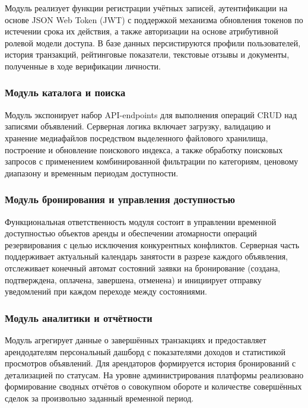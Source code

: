 Модуль реализует функции регистрации учётных записей, аутентификации на основе JSON Web Token (JWT) с поддержкой механизма обновления токенов по истечении срока их действия, а также авторизации на основе атрибутивной ролевой модели доступа. В базе данных персистируются профили пользователей, история транзакций, рейтинговые показатели, текстовые отзывы и документы, полученные в ходе верификации личности.
 
\subsubsection{Модуль каталога и поиска}
 
Модуль экспонирует набор API-endpoints для выполнения операций CRUD над записями объявлений. Серверная логика включает загрузку, валидацию и хранение медиафайлов посредством выделенного файлового хранилища, построение и обновление поискового индекса, а также обработку поисковых запросов с применением комбинированной фильтрации по категориям, ценовому диапазону и временным периодам доступности.
 
\subsubsection{Модуль бронирования и управления доступностью}
 
Функциональная ответственность модуля состоит в управлении временной доступностью объектов аренды и обеспечении атомарности операций резервирования с целью исключения конкурентных конфликтов. Серверная часть поддерживает актуальный календарь занятости в разрезе каждого объявления, отслеживает конечный автомат состояний заявки на бронирование (создана, подтверждена, оплачена, завершена, отменена) и инициирует отправку уведомлений при каждом переходе между состояниями.

 
\subsubsection{Модуль аналитики и отчётности}
 
Модуль агрегирует данные о завершённых транзакциях и предоставляет арендодателям персональный дашборд с показателями доходов и статистикой просмотров объявлений. Для арендаторов формируется история бронирований с детализацией по статусам. На уровне администрирования платформы реализовано формирование сводных отчётов о совокупном обороте и количестве совершённых сделок за произвольно заданный временной период.
 
